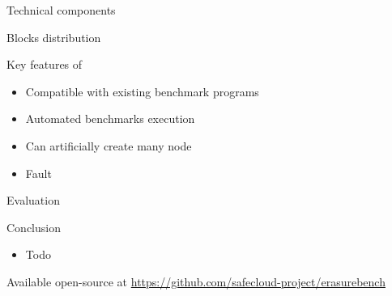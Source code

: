 \begin{frame}{Technical components}
    \centering
    
\end{frame}

\begin{frame}{Blocks distribution}
    \centering
    
\end{frame}

\begin{frame}{Key features of \sys}
    \begin{itemize}
        \item Compatible with existing benchmark programs
        \item Automated benchmarks execution
        \item Can artificially create many node
        \item Fault 
    \end{itemize}
\end{frame}

\subtitle[Evaluation]{Evaluation}

\begin{frame}{Evaluation}
\end{frame}

\subtitle[Conclusion]{Conclusion}

\begin{frame}{Conclusion}
    \begin{itemize}
        \item Todo
    \end{itemize}
    
    Available open-source at \url{https://github.com/safecloud-project/erasurebench}
\end{frame}




